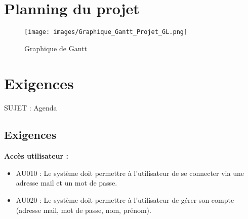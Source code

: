 \documentclass{article}
\begin{document}
\section{Planning du projet}
\begin{figure}[H]
    \centering
    \texttt{[image: images/Graphique\_Gantt\_Projet\_GL.png]}
    \caption{Graphique de Gantt}
\end{figure}

\newpage
\section{Exigences}

SUJET : Agenda


\subsection{Exigences}

\textbf{Accès utilisateur :}
\begin{itemize}
    \item AU010 : Le système doit permettre à l’utilisateur de se connecter via une adresse mail et un mot de passe.
    \item AU020 : Le système doit permettre à l’utilisateur de gérer son compte (adresse mail, mot de passe, nom, prénom).
\end{itemize}
\end{document}

